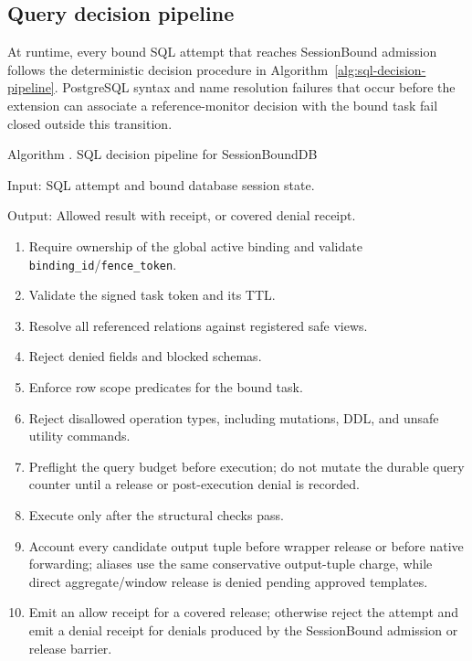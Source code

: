 \documentclass[journal]{IEEEtran}
\newcounter{algorithm}
\begin{document}
\hypertarget{query-decision-pipeline}{%
\subsection{Query decision
pipeline}\label{query-decision-pipeline}}

At runtime, every bound SQL attempt that reaches SessionBound admission
follows the deterministic decision procedure in
Algorithm~\ref{alg:sql-decision-pipeline}. PostgreSQL syntax and name
resolution failures that occur before the extension can associate a
reference-monitor decision with the bound task fail closed outside this
transition.

\begin{center}
\label{alg:sql-decision-pipeline}
\begin{minipage}{0.9\linewidth}
Algorithm \thealgorithm. SQL decision pipeline for SessionBoundDB

Input: SQL attempt and bound database session state.

Output: Allowed result with receipt, or covered denial receipt.

\begin{enumerate}
\item Require ownership of the global active binding and validate
  \texttt{binding\_id}/\texttt{fence\_token}.
\item Validate the signed task token and its TTL.
\item Resolve all referenced relations against registered safe views.
\item Reject denied fields and blocked schemas.
\item Enforce row scope predicates for the bound task.
\item Reject disallowed operation types, including mutations, DDL, and
unsafe utility commands.
\item Preflight the query budget before execution; do not mutate the
  durable query counter until a release or post-execution denial is
  recorded.
\item Execute only after the structural checks pass.
\item Account every candidate output tuple before wrapper release or
before native forwarding; aliases use the same conservative output-tuple
charge, while direct aggregate/window release is denied pending approved
templates.
\item Emit an allow receipt for a covered release; otherwise reject the
attempt and emit a denial receipt for denials produced by the
SessionBound admission or release barrier.
\end{enumerate}
\end{minipage}
\end{center}
\end{document}
